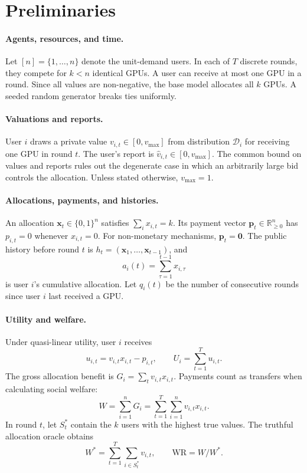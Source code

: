 \documentclass{article}
\begin{document}
\section{Preliminaries}
\label{sec:prelim}

\paragraph{Agents, resources, and time.}
Let $[n]=\{1,\ldots,n\}$ denote the unit-demand users. In each of $T$
discrete rounds, they compete for $k<n$ identical GPUs. A user can receive at
most one GPU in a round. Since all values are non-negative, the base model
allocates all $k$ GPUs. A seeded random generator breaks ties uniformly.

\paragraph{Valuations and reports.}
User $i$ draws a private value $v_{i,t}\in[0,v_{\max}]$ from distribution
$\mathcal D_i$ for receiving one GPU in round $t$. The user's report is
$\hat v_{i,t}\in[0,v_{\max}]$. The common bound on values and reports rules
out the degenerate case in which an arbitrarily large bid controls the
allocation. Unless stated otherwise, $v_{\max}=1$.

\paragraph{Allocations, payments, and histories.}
An allocation $\mathbf x_t\in\{0,1\}^n$ satisfies
$\sum_i x_{i,t}=k$. Its payment vector
$\mathbf p_t\in\mathbb R_{\ge 0}^n$ has $p_{i,t}=0$ whenever
$x_{i,t}=0$. For non-monetary mechanisms, $\mathbf p_t=\mathbf0$. The public
history before round $t$ is
$h_t=(\mathbf x_1,\ldots,\mathbf x_{t-1})$, and
\[
  a_i(t)=\sum_{\tau=1}^{t-1}x_{i,\tau}
\]
is user $i$'s cumulative allocation. Let $q_i(t)$ be the number of
consecutive rounds since user $i$ last received a GPU.

\paragraph{Utility and welfare.}
Under quasi-linear utility, user $i$ receives
\[
  u_{i,t}=v_{i,t}x_{i,t}-p_{i,t},
  \qquad U_i=\sum_{t=1}^T u_{i,t}.
\]
The gross allocation benefit is $G_i=\sum_t v_{i,t}x_{i,t}$. Payments count as
transfers when calculating social welfare:
\[
  W=\sum_{i=1}^nG_i
   =\sum_{t=1}^T\sum_{i=1}^n v_{i,t}x_{i,t}.
\]
In round $t$, let $S_t^*$ contain the $k$ users with the highest true values.
The truthful allocation oracle obtains
\[
  W^*=\sum_{t=1}^T\sum_{i\in S_t^*}v_{i,t},
  \qquad \mathrm{WR}=W/W^*.
\]
\end{document}
